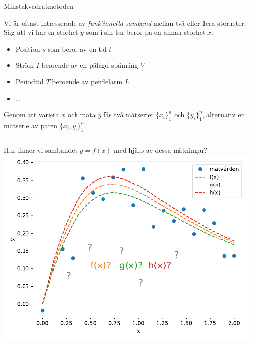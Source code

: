 \documentclass[9pt]{beamer}
\begin{document}
    \begin{frame}
        \begin{center}
            \huge{Minstakvadratmetoden}
        \end{center}
    \end{frame}

    \begin{frame}
        Vi är oftast intresserade av \emph{funktionella samband} mellan två
        eller flera storheter. Säg att vi har en storhet $y$ som i sin tur beror på en annan storhet $x$.

        \begin{itemize}
            \item Position $s$ som beror av en tid $t$
            \item Ström $I$ beroende av en pålagd spänning $V$
            \item Periodtid $T$ beroende av pendelarm $L$
            \item \ldots
        \end{itemize}

        Genom att variera $x$ och mäta $y$ fås två mätserier $\{x_i\}_1^n$ och
        $\{y_i\}_1^n$, alternativ en mätserie av paren $\{x_i,y_i\}_1^n$.

        \vfill
        \begin{columns}
            Hur finner vi sambandet $y=f(x)$ med hjälp av dessa mätningar?
            \includegraphics[width=\textwidth]{anpassning0.pdf}
        \end{columns}
    \end{frame}
\end{document}
